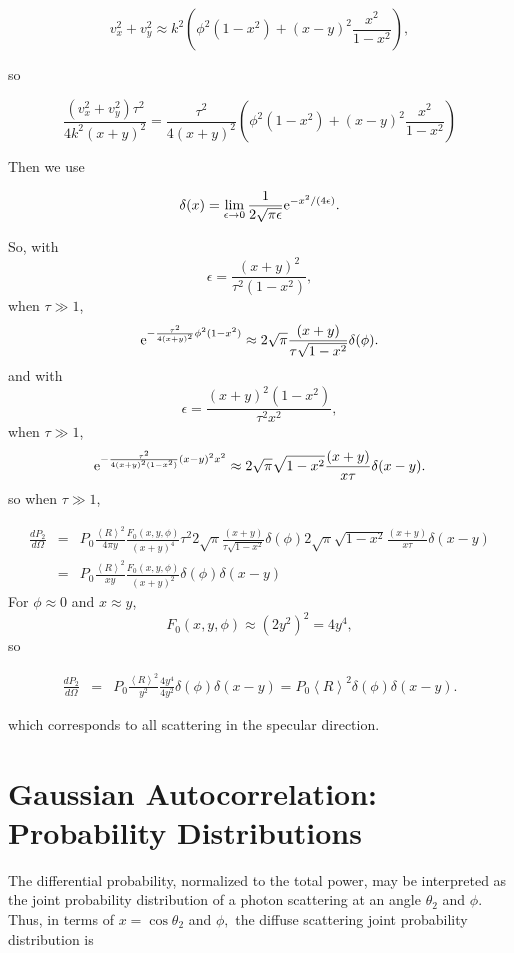 \documentclass[11pt,openany]{report}
\newcommand{\der}[2]{\frac{d {#1}}{d {#2}}}
\newcommand{\e}{{\rm e}}
\begin{document}
{{$$v_{x}^{2}+v_{y}^{2}\approx k^{2}\left(\phi^{2}(1-x^{2})+(x-y)^{2}\frac{x^{2}}{1-x^{2}}\right),$$

so

$$\frac{(v_{x}^{2}+v_{y}^{2})\tau^{2}}{4k^{2}(x+y)^{2}}=\frac{\tau^{2}}{4(x+y)^{2}}\left(\phi^{2}(1-x^{2})+(x-y)^{2}\frac{x^{2}}{1-x^{2}}\right)$$

Then we use

$$\delta(x)=\lim_{\epsilon\rightarrow 0}\frac{1}{2\sqrt{\pi\epsilon}}\e^{-x^{2}/(4\epsilon)}.$$

So, with $$\epsilon=\frac{(x+y)^{2}}{\tau^{2}(1-x^{2})},$$
when $\tau\gg 1$, 
$$\e^{-\frac{\tau^{2}}{4(x+y)^{2}}\phi^{2}(1-x^{2})}\approx 2\sqrt{\pi}\frac{(x+y)}{\tau\sqrt{1-x^{2}}}\delta(\phi).$$
and
 with $$\epsilon=\frac{(x+y)^{2}(1-x^{2})}{\tau^{2}x^{2}},$$
when $\tau\gg 1$, 
$$\e^{-\frac{\tau^{2}}{4(x+y)^{2}(1-x^{2})}(x-y)^{2}x^{2}}\approx 2\sqrt{\pi}\sqrt{1-x^{2}}\frac{(x+y)}{x\tau}\delta(x-y).$$
so when $\tau\gg 1$, 

\begin{eqnarray}
\der{P_{2}}{\Omega}&=&P_{0}\frac{\left<R\right>^{2}}{4\pi y}\frac{F_{0}(x,y,\phi)}{(x+y)^{4}}\tau^{2}2\sqrt{\pi}\frac{(x+y)}{\tau\sqrt{1-x^{2}}}\delta(\phi)2\sqrt{\pi}\sqrt{1-x^{2}}\frac{(x+y)}{x\tau}\delta(x-y)\\
&=&P_{0}\frac{\left<R\right>^{2}}{xy}\frac{F_{0}(x,y,\phi)}{(x+y)^{2}}\delta(\phi)\delta(x-y)
\end{eqnarray}
For $\phi\approx 0$ and $x\approx y$, 
$$F_{0}(x,y,\phi)\approx\left(2y^{2}\right)^{2}=4y^{4},$$
so

\begin{eqnarray}
\der{P_{2}}{\Omega}
&=&P_{0}\frac{\left<R\right>^{2}}{y^{2}}\frac{4y^{4}}{4y^{2}}\delta(\phi)\delta(x-y)=P_{0}\left<R\right>^{2}\delta(\phi)\delta(x-y).
\end{eqnarray}

which corresponds to all scattering in the specular direction.


\section{Gaussian Autocorrelation: Probability Distributions}

The differential probability, normalized to the total power, may be interpreted as the joint probability distribution of a photon scattering at an angle $\theta_{2}$ and $\phi$.  Thus, in terms of $x=\cos\theta_{2}$ and $\phi,$ the diffuse scattering joint probability distribution is

}}
\end{document}
